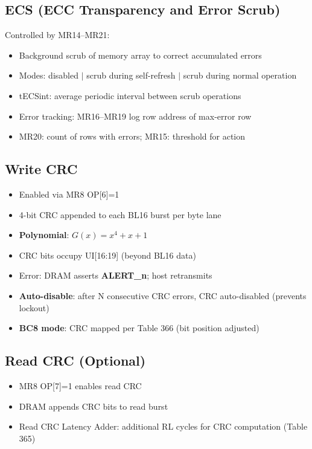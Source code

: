 \documentclass[10pt,a4paper,twoside]{article}
\begin{document}
\subsection{ECS (ECC Transparency and Error Scrub)}

Controlled by MR14--MR21:
\begin{itemize}
  \item Background scrub of memory array to correct accumulated errors
  \item Modes: disabled $|$ scrub during self-refresh $|$ scrub during normal operation
  \item tECSint: average periodic interval between scrub operations
  \item Error tracking: MR16--MR19 log row address of max-error row
  \item MR20: count of rows with errors; MR15: threshold for action
\end{itemize}

\subsection{Write CRC}

\begin{itemize}
  \item Enabled via MR8 OP[6]=1
  \item 4-bit CRC appended to each BL16 burst per byte lane
  \item \textbf{Polynomial}: $G(x) = x^4 + x + 1$
  \item CRC bits occupy UI[16:19] (beyond BL16 data)
  \item Error: DRAM asserts \textbf{ALERT\_n}; host retransmits
  \item \textbf{Auto-disable}: after N consecutive CRC errors, CRC auto-disabled (prevents lockout)
  \item \textbf{BC8 mode}: CRC mapped per Table 366 (bit position adjusted)
\end{itemize}

\subsection{Read CRC (Optional)}

\begin{itemize}
  \item MR8 OP[7]=1 enables read CRC
  \item DRAM appends CRC bits to read burst
  \item Read CRC Latency Adder: additional RL cycles for CRC computation (Table 365)
\end{itemize}
\end{document}
